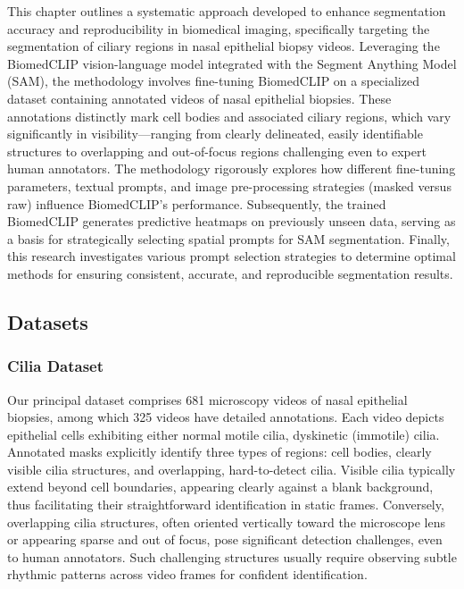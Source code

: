 \documentclass[./dissertation.tex]{subfiles}
\begin{document}
This chapter outlines a systematic approach developed to enhance segmentation accuracy and reproducibility in biomedical imaging, specifically targeting the segmentation of ciliary regions in nasal epithelial biopsy videos. Leveraging the BiomedCLIP vision-language model integrated with the Segment Anything Model (SAM), the methodology involves fine-tuning BiomedCLIP on a specialized dataset containing annotated videos of nasal epithelial biopsies. These annotations distinctly mark cell bodies and associated ciliary regions, which vary significantly in visibility—ranging from clearly delineated, easily identifiable structures to overlapping and out-of-focus regions challenging even to expert human annotators. The methodology rigorously explores how different fine-tuning parameters, textual prompts, and image pre-processing strategies (masked versus raw) influence BiomedCLIP's performance. Subsequently, the trained BiomedCLIP generates predictive heatmaps on previously unseen data, serving as a basis for strategically selecting spatial prompts for SAM segmentation. Finally, this research investigates various prompt selection strategies to determine optimal methods for ensuring consistent, accurate, and reproducible segmentation results.



\subsection{Datasets}

\subsubsection{Cilia Dataset}
Our principal dataset comprises 681 microscopy videos of nasal epithelial biopsies, among which 325 videos have detailed annotations. Each video depicts epithelial cells exhibiting either normal motile cilia, dyskinetic (immotile) cilia. Annotated masks explicitly identify three types of regions: cell bodies, clearly visible cilia structures, and overlapping, hard-to-detect cilia. Visible cilia typically extend beyond cell boundaries, appearing clearly against a blank background, thus facilitating their straightforward identification in static frames. Conversely, overlapping cilia structures, often oriented vertically toward the microscope lens or appearing sparse and out of focus, pose significant detection challenges, even to human annotators. Such challenging structures usually require observing subtle rhythmic patterns across video frames for confident identification.
\end{document}
